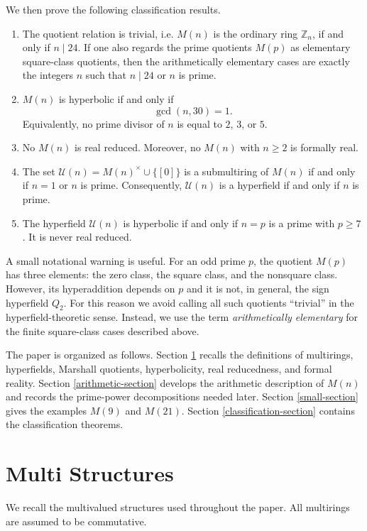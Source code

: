 \documentclass[a4paper,10pt]{article}
\newcommand{\cl}[1]{\left[#1\right]}
\newcommand{\U}{\mathcal U}
\begin{document}
We then prove the following classification results.
\begin{enumerate}[i -]
    \item The quotient relation is trivial, i.e. $M(n)$ is the ordinary ring $\mathbb Z_n$, if and only if $n\mid24$.  If one also regards the prime quotients $M(p)$ as elementary square-class quotients, then the arithmetically elementary cases are exactly the integers $n$ such that $n\mid24$ or $n$ is prime.
    \item $M(n)$ is hyperbolic if and only if
    \[
        \gcd(n,30)=1.
    \]
    Equivalently, no prime divisor of $n$ is equal to $2$, $3$, or $5$.
    \item No $M(n)$ is real reduced.  Moreover, no $M(n)$ with $n\ge2$ is formally real.
    \item The set $\U(n)=M(n)^\times\cup\{\cl0\}$ is a submultiring of $M(n)$ if and only if $n=1$ or $n$ is prime.  Consequently, $\U(n)$ is a hyperfield if and only if $n$ is prime.
    \item The hyperfield $\U(n)$ is hyperbolic if and only if $n=p$ is a prime with $p\ge7$.  It is never real reduced.
\end{enumerate}

A small notational warning is useful.  For an odd prime $p$, the quotient $M(p)$ has three elements: the zero class, the square class, and the nonsquare class.  However, its hyperaddition depends on $p$ and it is not, in general, the sign hyperfield $Q_2$.  For this reason we avoid calling all such quotients ``trivial'' in the hyperfield-theoretic sense.  Instead, we use the term \emph{arithmetically elementary} for the finite square-class cases described above.

The paper is organized as follows.  Section \ref{preliminaries-section} recalls the definitions of multirings, hyperfields, Marshall quotients, hyperbolicity, real reducedness, and formal reality.  Section \ref{arithmetic-section} develops the arithmetic description of $M(n)$ and records the prime-power decompositions needed later.  Section \ref{small-section} gives the examples $M(9)$ and $M(21)$.  Section \ref{classification-section} contains the classification theorems.

\section{Multi Structures}\label{preliminaries-section}

We recall the multivalued structures used throughout the paper.  All multirings are assumed to be commutative.
\end{document}

